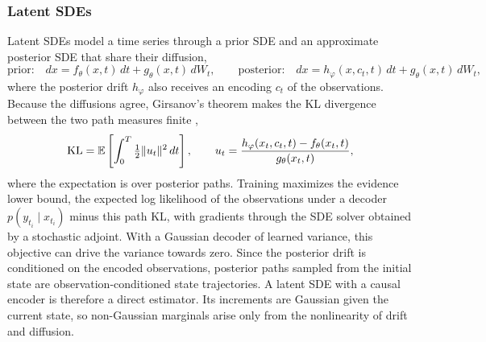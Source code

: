 \subsubsection{Latent SDEs}\label{sec:related-latent-sde}
Latent SDEs \citep{li2020scalable} model a time series through a prior SDE and an approximate posterior SDE that share their diffusion,
\begin{equation}\label{eq:latent-sde}
 \text{prior:}\quad dx=f_\theta(x,t)\,dt+g_\theta(x,t)\,dW_t,
 \qquad
 \text{posterior:}\quad dx=h_\varphi(x,c_t,t)\,dt+g_\theta(x,t)\,dW_t,
\end{equation}
where the posterior drift $h_\varphi$ also receives an encoding $c_t$ of the observations. Because the diffusions agree, Girsanov's theorem \citep[Sec.~8.6]{oksendal2003sde} makes the KL divergence between the two path measures finite \citep{li2020scalable},
\begin{equation}\label{eq:latent-sde-kl}
 \operatorname{KL}=\mathbb E\left[\int_0^T\tfrac12\|u_t\|^2\,dt\right],
 \qquad
 u_t=\frac{h_\varphi(x_t,c_t,t)-f_\theta(x_t,t)}{g_\theta(x_t,t)},
\end{equation}
where the expectation is over posterior paths. Training maximizes the evidence lower bound, the expected log likelihood of the observations under a decoder $p(y_{t_i}\mid x_{t_i})$ minus this path KL, with gradients through the SDE solver obtained by a stochastic adjoint. With a Gaussian decoder of learned variance, this objective can drive the variance towards zero. Since the posterior drift is conditioned on the encoded observations, posterior paths sampled from the initial state are observation-conditioned state trajectories. A latent SDE with a causal encoder is therefore a direct estimator. Its increments are Gaussian given the current state, so non-Gaussian marginals arise only from the nonlinearity of drift and diffusion.

